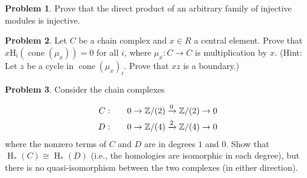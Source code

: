 \documentclass[11pt]{article}
\theoremstyle{definition}
\newtheorem{problem}{Problem}
\begin{document}
\begin{problem}  Prove that the direct product of an arbitrary family of injective modules is injective.
\end{problem}

\begin{problem}
Let $C$ be a chain complex and $x\in R$ a central element.  Prove that $x\operatorname{H_i}(\operatorname{cone}(\mu_x))=0$ for all $i$, where $\mu_x:C\to C$ is multiplication by $x$.  (Hint:  Let $z$ be a cycle in $\operatorname{cone}(\mu_x)_i$.  Prove that $xz$ is a boundary.)
\end{problem}

\begin{problem}  Consider the chain complexes 

\begin{align}
C:&\qquad 0\to \mathbb Z/(2)\xrightarrow{0} \mathbb Z/(2)\to 0 \notag \\
D:&\qquad  0\to \mathbb Z/(4)\xrightarrow{2} \mathbb Z/(4)\to 0 \notag
\end{align}
where the nonzero terms of $C$ and $D$ are in degrees $1$ and $0$.   Show that $\operatorname{H}_*(C)\cong \operatorname{H}_*(D)$ (i.e., the homologies are isomorphic in each degree), but there is no quasi-isomorphism between the two complexes (in either direction).

\end{problem}


 
\end{document}

